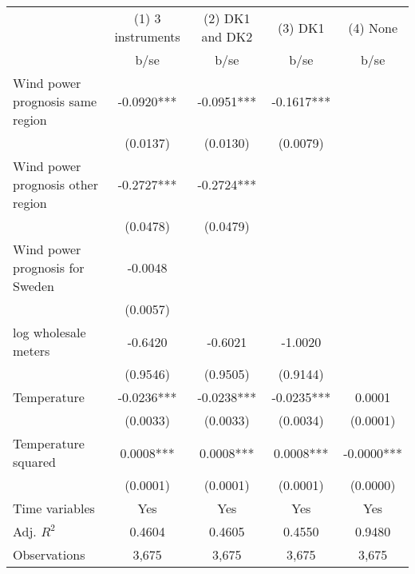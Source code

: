 \begin{tabular}{lcccc}\toprule
                    &(1) 3 instruments   &(2) DK1 and DK2   &     (3) DK1   &    (4) None   \\
                    &        b/se   &        b/se   &        b/se   &        b/se   \\
\midrule
Wind power prognosis same region&     -0.0920***&     -0.0951***&     -0.1617***&               \\
                    &    (0.0137)   &    (0.0130)   &    (0.0079)   &               \\
Wind power prognosis other region&     -0.2727***&     -0.2724***&               &               \\
                    &    (0.0478)   &    (0.0479)   &               &               \\
Wind power prognosis for Sweden&     -0.0048   &               &               &               \\
                    &    (0.0057)   &               &               &               \\
log wholesale meters&     -0.6420   &     -0.6021   &     -1.0020   &               \\
                    &    (0.9546)   &    (0.9505)   &    (0.9144)   &               \\
Temperature         &     -0.0236***&     -0.0238***&     -0.0235***&      0.0001   \\
                    &    (0.0033)   &    (0.0033)   &    (0.0034)   &    (0.0001)   \\
Temperature squared &      0.0008***&      0.0008***&      0.0008***&     -0.0000***\\
                    &    (0.0001)   &    (0.0001)   &    (0.0001)   &    (0.0000)   \\
Time variables      &         Yes   &         Yes   &         Yes   &         Yes   \\
\midrule
Adj. \(R^2\)        &      0.4604   &      0.4605   &      0.4550   &      0.9480   \\
Observations        &       3,675   &       3,675   &       3,675   &       3,675   \\
\bottomrule\end{tabular}
